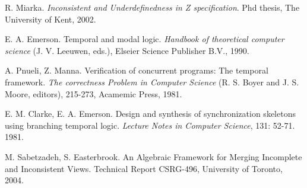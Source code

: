 \documentclass{entcs}
\begin{document}
\begin{thebibliography}{10}
 R. Miarka. \emph{Inconsistent and Underdefinedness in Z
specification}. Phd thesis, The University of Kent, 2002.

 E. A. Emerson.
Temporal and modal logic. \emph{Handbook of theoretical computer
science} (J. V. Leeuwen, eds.), Elseier Science Publisher B.V.,
1990.

 A. Pnueli, Z. Manna. Verification of concurrent
programs: The temporal framework. \emph{The correctness Problem in
Computer Science} (R. S. Boyer and J. S. Moore, editors), 215-273,
Acamemic Press, 1981.

 E. M. Clarke, E. A. Emerson. Design and synthesis of
synchronization skeletons using branching temporal logic.
 \emph{Lecture Notes in Computer Science}, 131: 52-71.  1981.

 M. Sabetzadeh, S. Easterbrook.
An Algebraic Framework for Merging Incomplete and Inconsistent
Views. Technical Report CSRG-496, University of Toronto, 2004.

\end{thebibliography}
\end{document}
